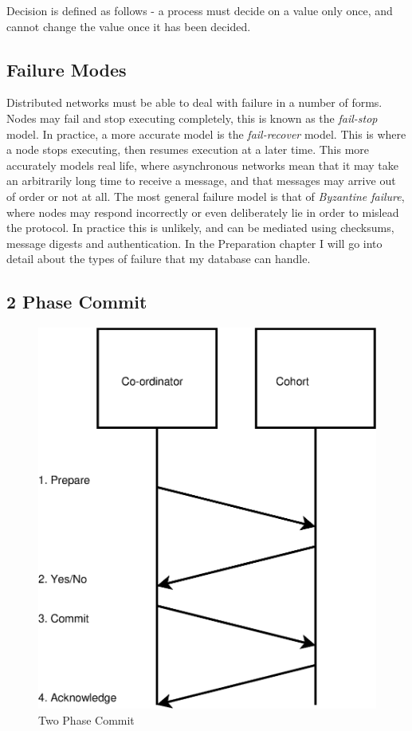 \documentclass[12pt,twoside,notitlepage]{report}
\begin{document}
Decision is defined as follows - a process must decide on a value only once, and cannot change the
value once it has been decided.

\subsection*{Failure Modes}

Distributed networks must be able to deal with failure in a number of forms. Nodes may fail and
stop executing completely, this is known as the \emph{fail-stop} model. In practice, a more accurate
model is the \emph{fail-recover} model. This is where a node stops executing, then resumes execution
at a later time. This more accurately models real life, where asynchronous networks mean that it
may take an arbitrarily long time to receive a message, and that messages may arrive out of order
or not at all. The most general failure model is that of \emph{Byzantine failure}, where nodes may
respond incorrectly or even deliberately lie in order to mislead the protocol. In practice this is
unlikely, and can be mediated using checksums, message digests and authentication. In the
Preparation chapter I will go into detail about the types of failure that my database can handle.

\subsection*{2 Phase Commit}


\begin{figure}[h!]
\centering
\includegraphics[scale=0.5]{figs/two-pc.eps}
\caption{\label{fig:two-pc}Two Phase Commit}
\end{figure}
\end{document}
